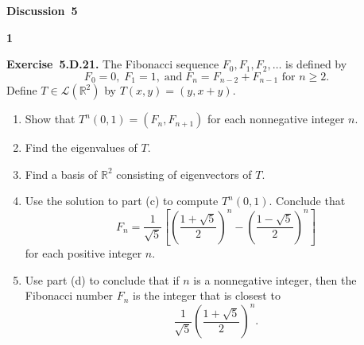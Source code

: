 \documentclass[11pt]{article}
\newcommand{\AssignmentType}{Discussion} %
\newcommand{\AssignmentNumber}{5}
\newcommand{\ProblemDivider}[1]{%
  \vspace{1.0em}
  \noindent\textbf{#1}\par
  \vspace{0.35em}
}
\newcommand{\ProblemAnnounce}{\noindent}
\newcommand{\Exercise}[1]{\textbf{Exercise~#1.}\;}
\begin{document}
\begin{center}
  {\Large \textbf{\AssignmentType~\AssignmentNumber}}
\end{center}
\vspace{0.75em}

\ProblemDivider{1}

\begin{problemBox}
\ProblemAnnounce
\Exercise{5.D.21}
The Fibonacci sequence \(F_{0},F_{1},F_{2},\ldots\) is defined by
\[F_{0} = 0,\; F_{1} = 1,\; \text{and}\; F_{n} = F_{n-2} + F_{n-1}\text{ for }n\geq 2.\]
Define \(T\in \mathcal{L}(\mathbb{R}^{2})\) by \(T(x,y) = (y,x + y)\).

\begin{enumerate}
    \item[(a)] Show that \(T^{n}(0,1) = (F_{n},F_{n + 1})\) for each nonnegative integer \(n\).
    \item[(b)] Find the eigenvalues of \(T\).
    \item[(c)] Find a basis of \(\mathbb{R}^{2}\) consisting of eigenvectors of \(T\).
    \item[(d)] Use the solution to part (c) to compute \(T^{n}(0,1)\). Conclude that
    \[F_{n} = \frac{1}{\sqrt{5}}\left[\left(\frac{1 + \sqrt{5}}{2}\right)^{n} - \left(\frac{1 - \sqrt{5}}{2}\right)^{n}\right]\]
    for each positive integer \(n\).
    \item[(e)] Use part (d) to conclude that if \(n\) is a nonnegative integer, then the Fibonacci number \(F_{n}\) is the integer that is closest to
    \[\frac{1}{\sqrt{5}}\left(\frac{1 + \sqrt{5}}{2}\right)^{n}.\]
\end{enumerate}
\end{problemBox}
\end{document}
